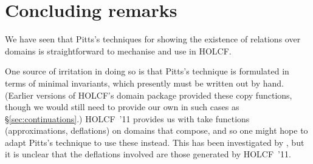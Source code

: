 \documentclass[11pt,a4paper]{article}
\begin{document}


\section{Concluding remarks}

We have seen that Pitts's techniques for showing the existence of
relations over domains is straightforward to mechanise and use in
HOLCF.

One source of irritation in doing so is that Pitts's technique is
formulated in terms of minimal invariants, which presently must be
written out by hand. (Earlier versions of HOLCF's domain package
provided these copy functions, though we would still need to provide
our own in such cases as \S\ref{sec:continuations}.) HOLCF~'11
provides us with take functions (approximations, deflations) on
domains that compose, and so one might hope to adapt Pitts's technique
to use these instead. This has been investigated by
\citet[\S6]{DBLP:conf/ppdp/BentonKBH09}, but it is unclear that the
deflations involved are those generated by HOLCF~'11.



\end{document}
